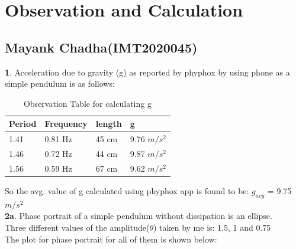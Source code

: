 \documentclass[11pt]{scrartcl} %
\begin{document}
\section{Observation and Calculation}
\subsection{Mayank Chadha(IMT2020045)}
\textbf{1}.
Acceleration due to gravity (g) as reported by phyphox by using phone as a simple pendulum is as follows:\\

\begin{table}[h] %
	\centering %
	\begin{tabular}{l l l l}
		\toprule
		\textbf{Period} & \textbf{Frequency} & \textbf{length} & \textbf{g} \\
		\midrule
		1.41 & 0.81 Hz & 45 cm & 9.76 $m/s^2$\\
        1.46 & 0.72 Hz & 44 cm & 9.87 $m/s^2$\\
        1.56 & 0.59 Hz & 67 cm & 9.62 $m/s^2$\\
		\bottomrule
	\end{tabular}
	\caption{Observation Table for calculating g}
\end{table}

So the avg. value of g calculated using phyphox app is found to be: $g_{avg}$ = 9.75 $m/s^2$ \\
\textbf{2a}.
Phase portrait of a simple pendulum without dissipation is an ellipse.\\
Three different values of the amplitude($\theta$) taken by me is: 1.5, 1 and 0.75\\

The plot for phase portrait for all of them is shown below:
\end{document}
